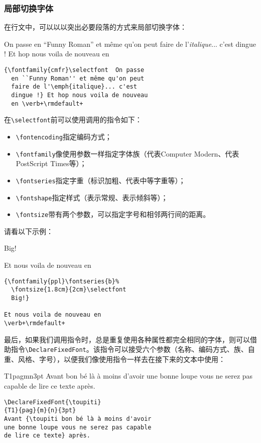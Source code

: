 \subsubsection{局部切换字体}

在行文中，可以以以突出必要段落的方式来局部切换字体：

\begin{codelist}[9.13]{
    { \selectfont  On passe
    en ``Funny Roman'' et même qu'on peut
    faire de l'\emph{italique}... c'est
    dingue !} Et hop nous voila de nouveau
    en 
}\begin{verbatim}
{\fontfamily{cmfr}\selectfont  On passe
  en ``Funny Roman'' et même qu'on peut
  faire de l'\emph{italique}... c'est
  dingue !} Et hop nous voila de nouveau
  en \verb+\rmdefault+
\end{verbatim}
\end{codelist}

在\verb|\selectfont|前可以使用调用的指令如下：

\begin{itemize}
    \item \verb|\fontencoding|指定编码方式；
    \item \verb|\fontfamily|像使用参数一样指定字体族（代表Computer Modern、代表PostScript Times等）；
    \item \verb|\fontseries|指定字重（标识加粗、代表中等字重等）；
    \item \verb|\fontshape|指定样式（表示常规、表示倾斜等）；
    \item \verb|\fontsize|带有两个参数，可以指定字号和相邻两行间的距离。
\end{itemize}

请看以下示例：

\begin{codelist}[9.14]{
    { %
  \fontsize{1.8cm}{2cm}\selectfont
  Big!}
  
Et nous voila de nouveau en
}\begin{verbatim}
{\fontfamily{ppl}\fontseries{b}%
  \fontsize{1.8cm}{2cm}\selectfont
  Big!}

Et nous voila de nouveau en
\verb+\rmdefault+
\end{verbatim}
\end{codelist}

最后，如果我们调用指令时，总是重复使用各种属性都完全相同的字体，则可以借助指令\verb|\DeclareFixedFont|。该指令可以接受六个参数（名称、编码方式、族、自重、风格、字号），以便我们像使用指令一样去在接下来的文本中使用：

\begin{codelist}[9.15]{
\DeclareFixedFont{\toupiti}
{T1}{pag}{m}{n}{3pt}
Avant {\toupiti bon bé là à moins d'avoir
une bonne loupe vous ne serez pas capable
de lire ce texte} après.
}\begin{verbatim}
\DeclareFixedFont{\toupiti}
{T1}{pag}{m}{n}{3pt}
Avant {\toupiti bon bé là à moins d'avoir
une bonne loupe vous ne serez pas capable
de lire ce texte} après.
\end{verbatim}
\end{codelist}

